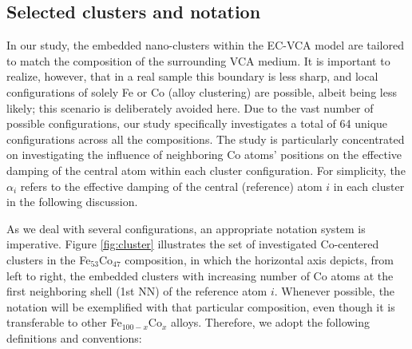 \subsection{Selected clusters and notation}
\label{subsec:clusters}

In our study, the embedded nano-clusters within the EC-VCA model are tailored to match the composition of the surrounding VCA medium. It is important to realize, however, that in a real sample this boundary is less sharp, and local configurations of solely Fe or Co (alloy clustering) are possible, albeit being less likely; this scenario is deliberately avoided here. Due to the vast number of possible configurations, our study specifically investigates a total of 64 unique configurations across all the compositions. The study is particularly concentrated on investigating the influence of neighboring Co atoms' positions on the effective damping of the central atom within each cluster configuration. For simplicity, the $\alpha_i$ refers to the effective damping of the central (reference) atom $i$ in each cluster in the following discussion. 

As we deal with several configurations, an appropriate notation system is imperative. Figure \ref{fig:cluster} illustrates the set of investigated Co-centered clusters in the Fe$_{53}$Co$_{47}$ composition, in which the horizontal axis depicts, from left to right, the embedded clusters with increasing number of Co atoms at the first neighboring shell (1st NN) of the reference atom $i$. Whenever possible, the notation will be exemplified with that particular composition, even though it is transferable to other Fe$_{100-x}$Co$_{x}$ alloys. Therefore, we adopt the following definitions and conventions:

